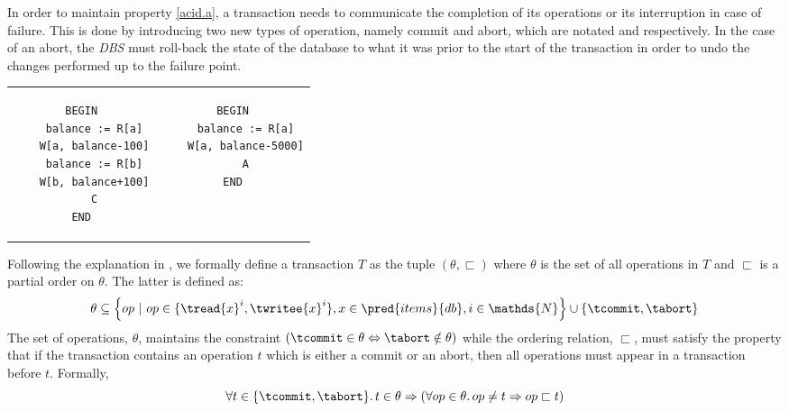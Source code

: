 In order to maintain property \ref{acid.a}, a transaction needs to communicate the completion of its operations or its interruption in case of failure. This is done by introducing two new types of operation, namely commit and abort, which are notated \tcommit and \tabort respectively. In the case of an abort, the \textit{DBS} must roll-back the state of the database to what it was prior to the start of the transaction in order to undo the changes performed up to the failure point.

\begin{center}
\begin{tabular}{c@{\hskip 0.5in}c}
\begin{lstlisting}
BEGIN
	balance := R[a]
	W[a, balance-100]
	balance := R[b]
	W[b, balance+100]
	C
END
\end{lstlisting}
&
\begin{lstlisting}
BEGIN
	balance := R[a]
	W[a, balance-5000]
	A
END
\end{lstlisting}
\end{tabular}
\label{fig:transfer}
\end{center}

Following the explanation in \cite{ccontrol}, we formally define a transaction $T$ as the tuple $(\theta, \sqsubset)$ where $\theta$ is the set of all operations in $T$ and $\sqsubset$ is a partial order on $\theta$. The latter is defined as:
\[
	\theta \subseteq \left\lbrace op\ |\ op \in \lbrace \tread{x}^i, \twritee{x}^i \rbrace, x \in \pred{items}{db}, i \in \mathds{N} \right\rbrace \cup \left\lbrace \tcommit, \tabort \right\rbrace
\]
The set of operations, $\theta$, maintains the constraint $\left(\tcommit \in \theta \Leftrightarrow \tabort \notin \theta\right)$ while the ordering relation, $\sqsubset$, must satisfy the property that if the transaction contains an operation $t$ which is either a commit or an abort, then all operations must appear in a transaction before $t$. Formally,
\[
	\forall t \in \{\tcommit, \tabort\} \ldotp t \in \theta \Rightarrow \left( \forall op \in \theta \ldotp op \neq t \Rightarrow op \sqsubset t \right)
\]

